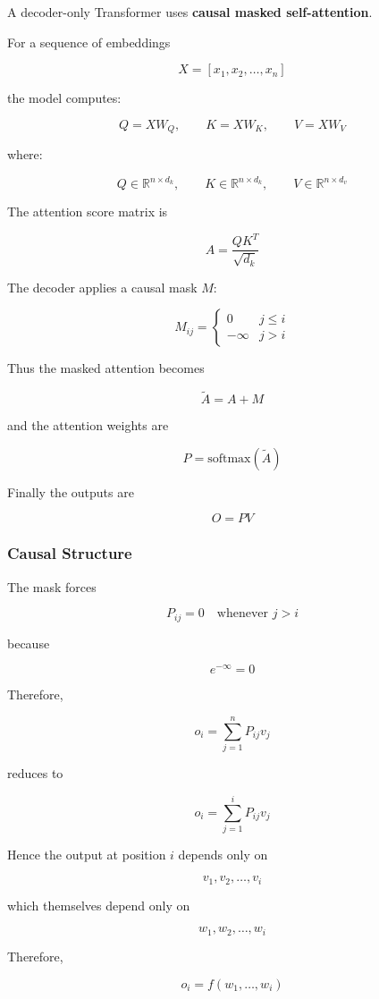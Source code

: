 \documentclass[12pt]{article}
\begin{document}
A decoder-only Transformer uses \textbf{causal masked self-attention}.

For a sequence of embeddings

\[
X = [x_1,x_2,\dots,x_n]
\]

the model computes:

\[
Q = XW_Q,
\qquad
K = XW_K,
\qquad
V = XW_V
\]

where:

\[
Q \in \mathbb R^{n\times d_k},
\qquad
K \in \mathbb R^{n\times d_k},
\qquad
V \in \mathbb R^{n\times d_v}
\]

The attention score matrix is

\[
A
=
\frac{QK^T}{\sqrt{d_k}}
\]

The decoder applies a causal mask \(M\):

\[
M_{ij}
=
\begin{cases}
0 & j \leq i \\
-\infty & j > i
\end{cases}
\]

Thus the masked attention becomes

\[
\widetilde A
=
A + M
\]

and the attention weights are

\[
P
=
\mathrm{softmax}(\widetilde A)
\]

Finally the outputs are

\[
O = PV
\]

\subsubsection*{Causal Structure}

The mask forces

\[
P_{ij}=0
\quad \text{whenever } j>i
\]

because

\[
e^{-\infty}=0
\]

Therefore,

\[
o_i
=
\sum_{j=1}^n P_{ij}v_j
\]

reduces to

\[
o_i
=
\sum_{j=1}^i P_{ij}v_j
\]

Hence the output at position \(i\) depends only on

\[
v_1,v_2,\dots,v_i
\]

which themselves depend only on

\[
w_1,w_2,\dots,w_i
\]

Therefore,

\[
o_i
=
f(w_1,\dots,w_i)
\]
\end{document}
